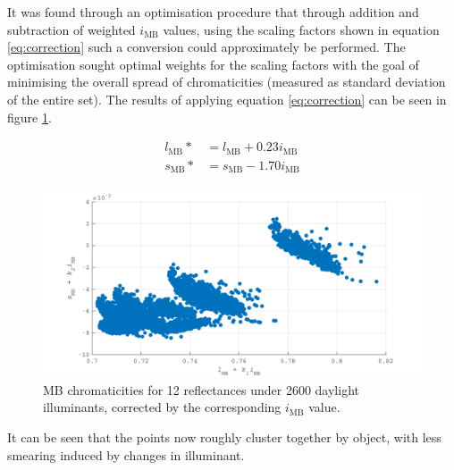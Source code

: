 It was found through an optimisation procedure that through addition and subtraction of weighted $i_{\text{MB}}$ values, using the scaling factors shown in equation \ref{eq:correction} such a conversion could approximately be performed. The optimisation sought optimal weights for the scaling factors with the goal of minimising the overall spread of chromaticities (measured as standard deviation of the entire set). The results of applying equation \ref{eq:correction} can be seen in figure \ref{fig:corrected}.

\begin{subequations} \label{eq:correction}
\begin{align}
l_{\text{MB}}* &= l_{\text{MB}} + 0.23i_{\text{MB}}\\ %
s_{\text{MB}}* &= s_{\text{MB}} - 1.70i_{\text{MB}}
\end{align}
\end{subequations}

\begin{figure}[htbp]
    \includegraphics[max width=\textwidth]{figs/comp/melcomp_1/correctedChromaticities.pdf}
    \caption{\gls{MB} chromaticities for 12 reflectances under 2600 daylight illuminants, corrected by the corresponding $i_{\text{MB}}$ value.}
    \label{fig:corrected}
\end{figure} 

It can be seen that the points now roughly cluster together by object, with less smearing induced by changes in illuminant.

